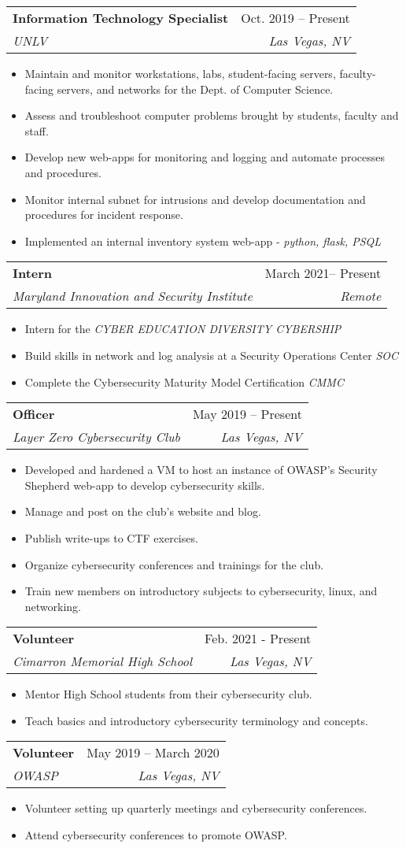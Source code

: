 \documentclass[letterpaper,11pt]{article}
\makeatletter
\newcommand{\resumeItem}[1]{
  \item\small{
    {#1 \vspace{-2pt}}
  }
}
\newcommand{\resumeSubheading}[4]{
  \vspace{-2pt}\item
    \begin{tabular*}{0.97\textwidth}[t]{l@{\extracolsep{\fill}}r}
      \textbf{#1} & #2 \\
      \textit{\small#3} & \textit{\small #4} \\
    \end{tabular*}\vspace{-7pt}
}
\newcommand{\resumeItemListStart}{\begin{itemize}}
\newcommand{\resumeItemListEnd}{\end{itemize}\vspace{-5pt}}
\makeatother
\begin{document}
    \resumeSubheading
      {Information Technology Specialist}{Oct. 2019 -- Present}
      {UNLV}{Las Vegas, NV}
      \resumeItemListStart
        \resumeItem{Maintain and monitor workstations, labs, student-facing servers, faculty-facing servers, and networks for the Dept. of Computer Science.}
        \resumeItem{Assess and troubleshoot computer problems brought by students, faculty and staff.}
        \resumeItem{Develop new web-apps for monitoring and logging and automate processes and procedures.}
        \resumeItem{Monitor internal subnet for intrusions and develop documentation and procedures for incident response.}
        \resumeItem{Implemented an internal inventory system web-app - \emph{python, flask, PSQL}}
    \resumeItemListEnd

    \resumeSubheading
      {Intern}{March 2021-- Present}
      {Maryland Innovation and Security Institute}{Remote}
      \resumeItemListStart
        \resumeItem{Intern for the \emph{CYBER EDUCATION DIVERSITY CYBERSHIP}}
        \resumeItem{Build skills in network and log analysis at a Security Operations Center \emph{SOC}}
        \resumeItem{Complete the Cybersecurity Maturity Model Certification \emph{CMMC}}
      \resumeItemListEnd
      
    \resumeSubheading
      {Officer}{May 2019 -- Present}
      {Layer Zero Cybersecurity Club}{Las Vegas, NV}
      \resumeItemListStart
        \resumeItem{Developed and hardened a VM to host an instance of OWASP's Security Shepherd web-app to develop cybersecurity skills.}
        \resumeItem{Manage and post on the club's website and blog.}
        \resumeItem{Publish write-ups to CTF exercises.}
        \resumeItem{Organize cybersecurity conferences and trainings for the club.}
        \resumeItem{Train new members on introductory subjects to cybersecurity, linux, and networking.}
      \resumeItemListEnd
      
    \resumeSubheading
      {Volunteer}{Feb. 2021 - Present}
      {Cimarron Memorial High School}{Las Vegas, NV}
      \resumeItemListStart
        \resumeItem{Mentor High School students from their cybersecurity club.}
        \resumeItem{Teach basics and introductory cybersecurity terminology and concepts.}
      \resumeItemListEnd

    \resumeSubheading
      {Volunteer}{May 2019 -- March 2020}
      {OWASP}{Las Vegas, NV}
      \resumeItemListStart
        \resumeItem{Volunteer setting up quarterly meetings and cybersecurity conferences.}
        \resumeItem{Attend cybersecurity conferences to promote OWASP.}
      \resumeItemListEnd
      
\end{document}
